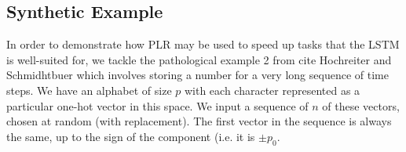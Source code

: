 \documentclass{article}
\begin{document}


\subsection{Synthetic Example}
In order to demonstrate how PLR may be used to speed up tasks that the LSTM is
well-suited for, we tackle the pathological example 2 from cite Hochreiter and
Schmidhtbuer which involves storing a number for a very long sequence of time
steps. We have an alphabet of size \(p\) with each character represented as a
particular one-hot vector in this space. We input a sequence of \(n\) of these
vectors, chosen at random (with replacement). The first vector in the sequence
is always the same, up to the sign of the component (i.e. it is \(\pm p_0
\).
\end{document}
